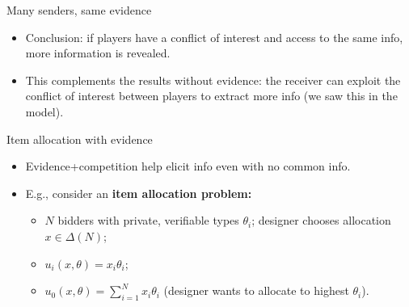 \documentclass[english,10pt
,aspectratio=169
]{beamer}
\begin{document}
\begin{frame}{Many senders, same evidence}
\begin{itemize}
	\item Conclusion: if players have a \alert{conflict of interest} and access to the same info, \alert{more information} is revealed. 
	
	\item This complements the results without evidence: the receiver can exploit the conflict of interest between players to extract more info (we saw this in the \cite{battaglini_multiple_2002} model).
\end{itemize}
\end{frame}


\begin{frame}{Item allocation with evidence \citep*{ben-porath_mechanisms_2019}}
\begin{itemize}
	\item Evidence+competition help elicit info even with no common info.
	\item E.g., consider an \textbf{item allocation problem:} 
	\begin{itemize}
		\item $N$ bidders with private, \alert{verifiable} types $\theta_i$; designer chooses allocation $x \in \varDelta(N)$;
		\item $u_i(x,\theta) = x_i \theta_i$;
		\item $u_0(x,\theta) = \sum_{i=1}^N x_i \theta_i$ (designer wants to allocate to highest $\theta_i$).
	\end{itemize}
\end{itemize}
\end{frame}
\end{document}
